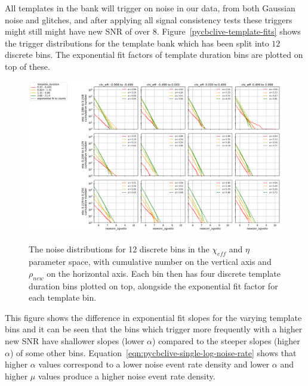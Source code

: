 All templates in the bank will trigger on noise in our data, from both Gaussian noise and glitches, and after applying all signal consistency tests these triggers might still might have new SNR of over $8$. Figure~\ref{pycbclive-template-fits} shows the trigger distributions for the template bank which has been split into $12$ discrete bins. The exponential fit factors of template duration bins are plotted on top of these.
%
\begin{figure}
  \centering
  \begin{minipage}[t]{1.0\linewidth}
  
    \includegraphics[width=1.0\textwidth]{images/5_pycbclive/H1-template_fits.png}
    \label{fig:pycbclive-H1-fits}

  \end{minipage}
  \caption{The noise distributions for 12 discrete bins in the $\chi_{eff}$ and $\eta$ parameter space, with cumulative number on the vertical axis and $\rho_{new}$ on the horizontal axis. Each bin then has four discrete template duration bins plotted on top, alongside the exponential fit factor for each template bin.}
  \label{fig:pycbclive-template-fits}
\end{figure}
%
This figure shows the difference in exponential fit slopes for the varying template bins and it can be seen that the bins which trigger more frequently with a higher new SNR have shallower slopes (lower $\alpha$) compared to the steeper slopes (higher $\alpha$) of some other bins. Equation~\ref{eqn:pycbclive-single-log-noise-rate} shows that higher $\alpha$ values correspond to a lower noise event rate density and lower $\alpha$ and higher $\mu$ values produce a higher noise event rate density.

